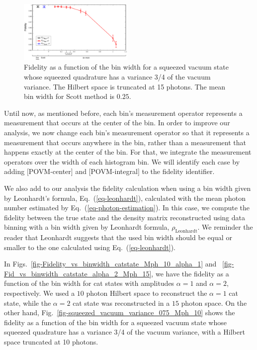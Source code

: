 \documentclass[
reprint,
superscriptaddress,
showpacs,
amsmath,
amssymb,
aps,
pra,
longbibliography
]{revtex4-1}
\begin{document}

\begin{figure}[h]
\includegraphics[width=0.49\textwidth]{squeezedvacuum_15_photons_Var=075.eps}
\caption{Fidelity as a function of the bin width for a squeezed vacuum state whose squeezed quadrature has a variance 3/4 of the vacuum variance. The Hilbert space is truncated at 15 photons. The mean bin width for Scott method is $0.25$.}
\label{fig-squeezedvacuum_15_photons_Var=075}
\end{figure}

Until now, as mentioned before, each bin's measurement operator represents a measurement that occurs at the center of the bin. In order to improve our analysis,
we now change each bin's measurement operator so that it represents a measurement that occurs anywhere in the bin, rather than a measurement that happens exactly at the center of the bin. For that, we integrate the measurement operators over the width of each histogram bin. We will identify each case by adding $[$POVM-center$]$ and $[$POVM-integral$]$ to the fidelity identifier.

We also add to our analysis the fidelity calculation when using a bin width given by Leonhardt's formula, Eq.~(\ref{eq-leonhardt}), calculated with the mean photon number estimated by Eq.~(\ref{eq-photon-estimation}). In this case, we compute the fidelity between the true state and the density matrix reconstructed using data binning with a bin width given by Leonhardt formula, $\rho_{\mathrm{Leonhardt}}$. We reminder the reader that Leonhardt suggests that the used bin width should be equal or smaller to the one calculated using Eq.~(\ref{eq-leonhardt}). 

In Figs.~\ref{fig-Fidelity_vs_binwidth_catstate_Mph_10_alpha_1} and
~\ref{fig-Fid_vs_binwidth_catstate_alpha_2_Mph_15}, we have the fidelity
as a function of the bin width for cat states with amplitudes $\alpha=1$ and
$\alpha=2$, respectively. We used a $10$ photon Hilbert space to reconstruct the
$\alpha = 1$ cat state, while the $\alpha = 2$ cat state was reconstructed in a
$15$ photon space. On the other hand, Fig.~\ref{fig-squeezed_vacuum_variance_075_Mph_10} shows the fidelity as a function of the 
bin width for a squeezed vacuum state whose squeezed quadrature has a variance 3/4 of the vacuum variance, with a Hilbert space truncated at 10 photons.
\end{document}
